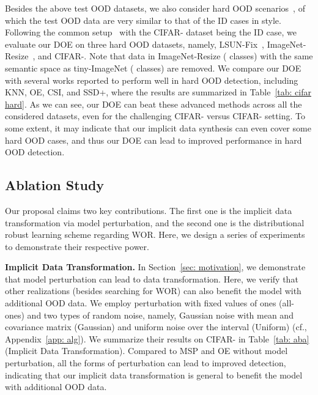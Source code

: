 \documentclass{article} \usepackage{iclr2022_conference,times}
\begin{document}
Besides the above test OOD datasets, we also consider hard OOD scenarios~\citep{Tack20CSI}, of which the test OOD data are very similar to that of the ID cases in style. Following the common setup~\citep{SunM0L22} with the CIFAR- dataset being the ID case, we evaluate our DOE on three hard OOD datasets, namely, LSUN-Fix~\citep{yu2015lsun}, ImageNet-Resize~\citep{deng2009imagenet}, and CIFAR-. Note that data in ImageNet-Resize ( classes) with the same semantic space as tiny-ImageNet ( classes) are removed. We compare our DOE with several works reported to perform well in hard OOD detection, including KNN, OE, CSI, and SSD+, where the results are summarized in Table~\ref{tab: cifar hard}. As we can see, our DOE can beat these advanced methods across all the considered datasets, even for the challenging CIFAR- versus CIFAR- setting. To some extent, it may indicate that our implicit data synthesis can even cover some hard OOD cases, and thus our DOE can lead to improved performance in hard OOD detection. 




\subsection{Ablation Study} \label{sec: ablation}




Our proposal claims two key contributions. The first one is the implicit data transformation via model perturbation, and the second one is the distributional robust learning scheme regarding WOR. Here, we design a series of experiments to demonstrate their respective power. 

\textbf{Implicit Data Transformation.} 
In Section~\ref{sec: motivation}, we demonstrate that model perturbation can lead to data transformation. Here, we verify that other realizations (besides searching for WOR) can also benefit the model with additional OOD data. We employ perturbation with fixed values of ones (all-ones) and two types of random noise, namely, Gaussian noise with  mean and  covariance matrix (Gaussian) and uniform noise over the interval  (Uniform) {(cf., Appendix~\ref{app: alg})}. We summarize their results on CIFAR- in Table~\ref{tab: aba} (Implicit Data Transformation). Compared to MSP and OE without model perturbation, all the forms of perturbation can lead to improved detection, indicating that our implicit data transformation is general to benefit the model with additional OOD data. 
\end{document}
